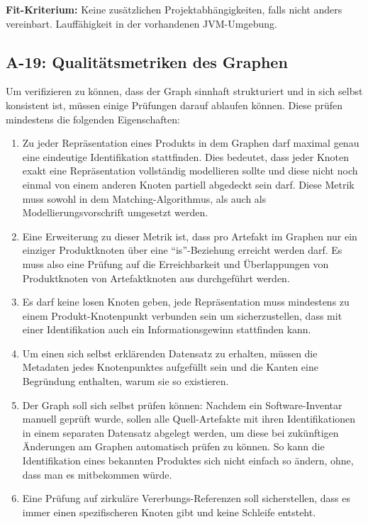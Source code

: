 \textbf{Fit-Kriterium:}
Keine zusätzlichen Projektabhängigkeiten, falls nicht anders vereinbart.
Lauffähigkeit in der vorhandenen JVM-Umgebung.

\subsection{A-19: Qualitätsmetriken des Graphen}\label{subsec:req-graph-inner-consistency}

Um verifizieren zu können, dass der Graph sinnhaft strukturiert und in sich selbst konsistent ist, müssen einige Prüfungen darauf ablaufen können.
Diese prüfen mindestens die folgenden Eigenschaften:

\begin{enumerate}
    \item Zu jeder Repräsentation eines Produkts in dem Graphen darf maximal genau eine eindeutige Identifikation stattfinden.
    Dies bedeutet, dass jeder Knoten exakt eine Repräsentation vollständig modellieren sollte und diese nicht noch einmal von einem anderen Knoten partiell abgedeckt sein darf.
    Diese Metrik muss sowohl in dem Matching-Algorithmus, als auch als Modellierungsvorschrift umgesetzt werden.
    \item Eine Erweiterung zu dieser Metrik ist, dass pro Artefakt im Graphen nur ein einziger Produktknoten über eine \enquote{is}-Beziehung erreicht werden darf.
    Es muss also eine Prüfung auf die Erreichbarkeit und Überlappungen von Produktknoten von Artefaktknoten aus durchgeführt werden.
    \item Es darf keine losen Knoten geben, jede Repräsentation muss mindestens zu einem Produkt-Knotenpunkt verbunden sein um sicherzustellen, dass mit einer Identifikation auch ein Informationsgewinn stattfinden kann.
    \item Um einen sich selbst erklärenden Datensatz zu erhalten, müssen die Metadaten jedes Knotenpunktes aufgefüllt sein und die Kanten eine Begründung enthalten, warum sie so existieren.
    \item Der Graph soll sich selbst prüfen können: Nachdem ein Software-Inventar manuell geprüft wurde, sollen alle Quell-Artefakte mit ihren Identifikationen in einem separaten Datensatz abgelegt werden, um diese bei zukünftigen Änderungen am Graphen automatisch prüfen zu können.
    So kann die Identifikation eines bekannten Produktes sich nicht einfach so ändern, ohne, dass man es mitbekommen würde.
    \item Eine Prüfung auf zirkuläre Vererbungs-Referenzen soll sicherstellen, dass es immer einen spezifischeren Knoten gibt und keine Schleife entsteht.
\end{enumerate}

